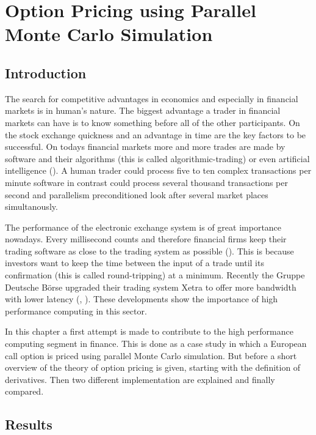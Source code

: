 \chapter{Option Pricing using Parallel Monte Carlo Simulation}
\label{chap:options}
\section{Introduction}
\label{sec:optionintro}

The search for competitive advantages in economics and especially in
financial markets is in human's nature. The biggest advantage a trader
in financial markets can have is to know something before all of the
other participants. On the stock exchange quickness and an advantage
in time are the key factors to be successful. On todays financial
markets more and more trades are made by software and their
algorithms (this is called algorithmic-trading) or even artificial
intelligence (\cite{bloomberg:hal9000}). A human trader could
process five to ten complex 
transactions per minute software in contrast could process several
thousand transactions per second and parallelism preconditioned look
after several market places simultanously.


The performance of the electronic exchange system is of great
importance nowadays. Every millisecond counts and therefore financial
firms keep their trading software as close to the trading system as
possible (\cite{wstonline:cuttingedge}). This is because investors
want to keep the time
between the input of a trade until its confirmation (this is called
round-tripping) at a minimum. Recently the Gruppe Deutsche B\"orse
upgraded their trading 
system Xetra to offer more bandwidth with lower latency (\cite{gdb:latency},
\cite{gdb:bandwidth}).
These developments show the importance of high performance computing
in this sector.


In this chapter a first attempt is made to contribute to the high performance
computing segment in finance. This is done as a case study in which a
European call option is priced using parallel Monte Carlo
simulation. But before a short overview of the theory of option
pricing is given, starting with the definition of derivatives. Then
two different implementation are explained and finally compared.




\section{Results}

